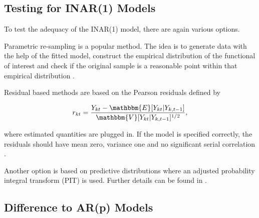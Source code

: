 \subsection{Testing for INAR(1) Models}
\label{sec:Testing for INAR(1) Models}

To test the adequacy of the INAR(1) model, there are again various options. 

Parametric re-sampling is a popular method. The idea is to generate data with the help of the fitted model, construct the empirical distribution of the functional of interest and check if the original sample is a reasonable point within that empirical distribution \cite{Silva:2005}. 

Residual based methods are based on the Pearson residuals defined by 

\begin{equation}
r_{kt} = \frac{Y_{kt}-\mathbbm{E}[Y_{kt}|Y_{k,t-1}]}{\mathbbm{V}[Y_{kt}|Y_{k,t-1}]^{1/2}},
\label{eq:Pearson residuals}
\end{equation}

where estimated quantities are plugged in. If the model is specified correctly, the residuals should have mean zero, variance one and no significant serial correlation \cite{Silva:2005}. 

Another option is based on predictive distributions where an adjusted probability integral transform (PIT) is used. Further details can be found in \cite{Silva:2005}. 

\subsection{Difference to AR(p) Models}
\label{sec: Difference to AR models}


